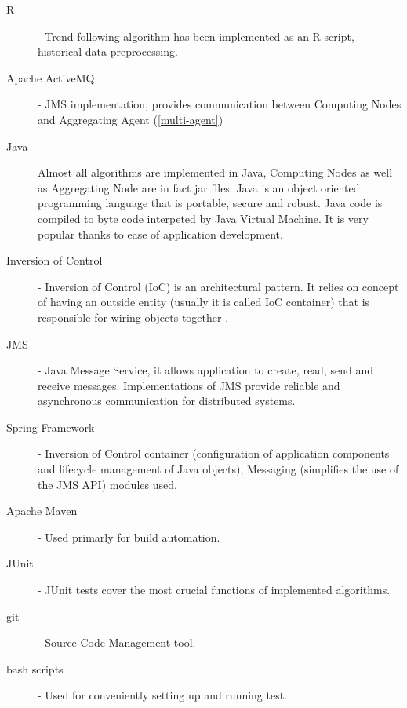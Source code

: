 \begin{description}
  \item [R]
      - Trend following algorithm has been implemented as an R script, historical data preprocessing.
  \item [Apache ActiveMQ]
      - JMS implementation, provides communication between Computing Nodes and Aggregating Agent (\ref{multi-agent})
  \item [Java]
      Almost all algorithms are implemented in Java, Computing Nodes as well as Aggregating Node are in fact jar files.
      Java is an object oriented programming language that is portable, secure and robust.
      Java code is compiled to byte code interpeted by Java Virtual Machine. 
      It is very popular thanks to ease of application development. 
  \item [Inversion of Control]
	- Inversion of Control (IoC) is an architectural pattern.
	It relies on concept of having an outside entity (usually it is called IoC container) that is responsible for wiring objects together \cite{Spring}. 
  \item [JMS]
	- Java Message Service, it allows application to create, read, send and receive messages.
	Implementations of JMS provide reliable and asynchronous communication for distributed systems. 

  \item [Spring Framework]
      - Inversion of Control container (configuration of application components and lifecycle management of Java objects), Messaging (simplifies the use of the JMS API) modules used.
  \item [Apache Maven]
      - Used primarly for build automation.
  \item [JUnit]
      - JUnit tests cover the most crucial functions of implemented algorithms.
  \item [git]
      - Source Code Management tool.
  \item [bash scripts]
      - Used for conveniently setting up and running test. 
\end{description}

 